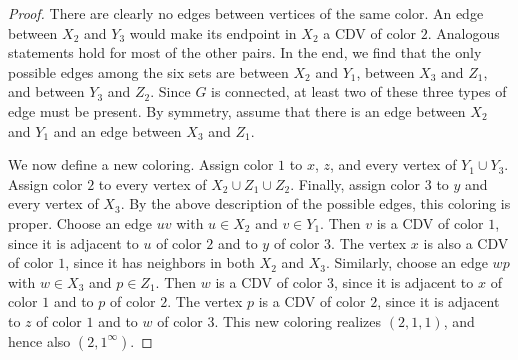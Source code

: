 \documentclass[10pt,a4paper]{amsart}
\begin{document}
\begin{proof}
There are clearly no edges between vertices of the same color. 
An edge between $X_2$ and $Y_3$ would make its endpoint in $X_2$ a CDV of color $2$.
Analogous statements hold for most of the other pairs.
In the end, we find that the only possible edges among the six sets are between $X_2$ and $Y_1$, between $X_3$ and $Z_1$, and between $Y_3$ and $Z_2$. 
Since $G$ is connected, at least two of these three types of edge must be present.
By symmetry, assume that there is an edge between $X_2$ and $Y_1$ and an edge between $X_3$ and $Z_1$.

We now define a new coloring. Assign color $1$ to $x$, $z$, and every vertex of $Y_1\cup Y_3$. Assign color $2$ to every vertex of $X_2\cup Z_1\cup Z_2$. Finally, assign color $3$ to $y$ and every vertex of $X_3$. By the above description of the possible edges, this coloring is proper. Choose an edge $uv$ with $u\in X_2$ and $v\in Y_1$. Then $v$ is a CDV of color $1$, since it is adjacent to $u$ of color $2$ and to $y$ of color $3$. The vertex $x$ is also a CDV of color $1$, since it has neighbors in both $X_2$ and $X_3$. Similarly, choose an edge $wp$ with $w\in X_3$ and $p\in Z_1$. Then $w$ is a CDV of color $3$, since it is adjacent to $x$ of color $1$ and to $p$ of color $2$. The vertex $p$ is a CDV of color $2$, since it is adjacent to $z$ of color $1$ and to $w$ of color $3$. This new coloring realizes $(2,1,1)$, and hence also $(2,1^\infty)$.
\end{proof}
\end{document}
